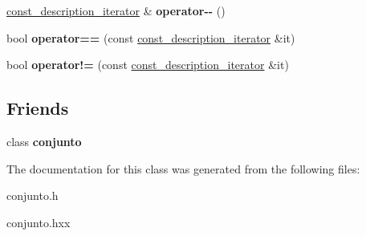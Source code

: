 \begin{DoxyCompactItemize}
\item 
\hypertarget{classconjunto_1_1const__description__iterator_a16ec555150a8860453d89fb13c01a9ba}{}\hyperlink{classconjunto_1_1const__description__iterator}{const\+\_\+description\+\_\+iterator} \& {\bfseries operator-\/-\/} ()\label{classconjunto_1_1const__description__iterator_a16ec555150a8860453d89fb13c01a9ba}

\item 
\hypertarget{classconjunto_1_1const__description__iterator_a6d95c930ad9fe2d68dc2bb1aab297cbf}{}bool {\bfseries operator==} (const \hyperlink{classconjunto_1_1const__description__iterator}{const\+\_\+description\+\_\+iterator} \&it)\label{classconjunto_1_1const__description__iterator_a6d95c930ad9fe2d68dc2bb1aab297cbf}

\item 
\hypertarget{classconjunto_1_1const__description__iterator_a35903beb5c46b783f26bcde196d26bbd}{}bool {\bfseries operator!=} (const \hyperlink{classconjunto_1_1const__description__iterator}{const\+\_\+description\+\_\+iterator} \&it)\label{classconjunto_1_1const__description__iterator_a35903beb5c46b783f26bcde196d26bbd}

\end{DoxyCompactItemize}
\subsection*{Friends}
\begin{DoxyCompactItemize}
\item 
\hypertarget{classconjunto_1_1const__description__iterator_a42fdcda39c77eabd7380e29fcdbe5dd2}{}class {\bfseries conjunto}\label{classconjunto_1_1const__description__iterator_a42fdcda39c77eabd7380e29fcdbe5dd2}

\end{DoxyCompactItemize}


The documentation for this class was generated from the following files\+:\begin{DoxyCompactItemize}
\item 
conjunto.\+h\item 
conjunto.\+hxx\end{DoxyCompactItemize}
